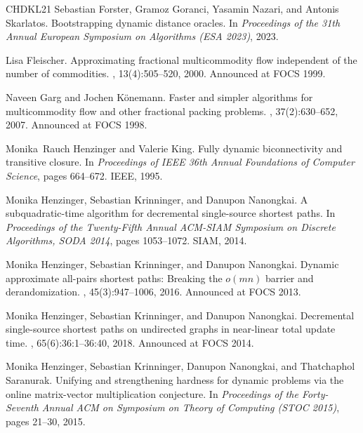 \documentclass[11pt]{article}
\theoremstyle{definition}
\theoremstyle{remark}
\begin{document}
\begin{titlepage}
\begin{thebibliography}{CHDKL21}
Sebastian Forster, Gramoz Goranci, Yasamin Nazari, and Antonis Skarlatos.
\newblock Bootstrapping dynamic distance oracles.
\newblock In {\em Proceedings of the 31th Annual European Symposium on
  Algorithms ({ESA} 2023)}, 2023.

Lisa Fleischer.
\newblock Approximating fractional multicommodity flow independent of the
  number of commodities.
, 13(4):505--520, 2000.
\newblock Announced at {FOCS} 1999.

Naveen Garg and Jochen K{\"{o}}nemann.
\newblock Faster and simpler algorithms for multicommodity flow and other
  fractional packing problems.
, 37(2):630--652, 2007.
\newblock Announced at {FOCS} 1998.

Monika~Rauch Henzinger and Valerie King.
\newblock Fully dynamic biconnectivity and transitive closure.
\newblock In {\em Proceedings of IEEE 36th Annual Foundations of Computer
  Science}, pages 664--672. IEEE, 1995.

Monika Henzinger, Sebastian Krinninger, and Danupon Nanongkai.
\newblock A subquadratic-time algorithm for decremental single-source shortest
  paths.
\newblock In {\em Proceedings of the Twenty-Fifth Annual {ACM-SIAM} Symposium
  on Discrete Algorithms, {SODA} 2014}, pages 1053--1072. {SIAM}, 2014.

Monika Henzinger, Sebastian Krinninger, and Danupon Nanongkai.
\newblock Dynamic approximate all-pairs shortest paths: Breaking the $o(mn)$
  barrier and derandomization.
, 45(3):947--1006, 2016.
\newblock Announced at {FOCS} 2013.

Monika Henzinger, Sebastian Krinninger, and Danupon Nanongkai.
\newblock Decremental single-source shortest paths on undirected graphs in
  near-linear total update time.
, 65(6):36:1--36:40, 2018.
\newblock Announced at {FOCS} 2014.

Monika Henzinger, Sebastian Krinninger, Danupon Nanongkai, and Thatchaphol
  Saranurak.
\newblock Unifying and strengthening hardness for dynamic problems via the
  online matrix-vector multiplication conjecture.
\newblock In {\em Proceedings of the Forty-Seventh Annual {ACM} on Symposium on
  Theory of Computing ({STOC} 2015)}, pages 21--30, 2015.


\end{thebibliography}
\end{titlepage}
\end{document}
